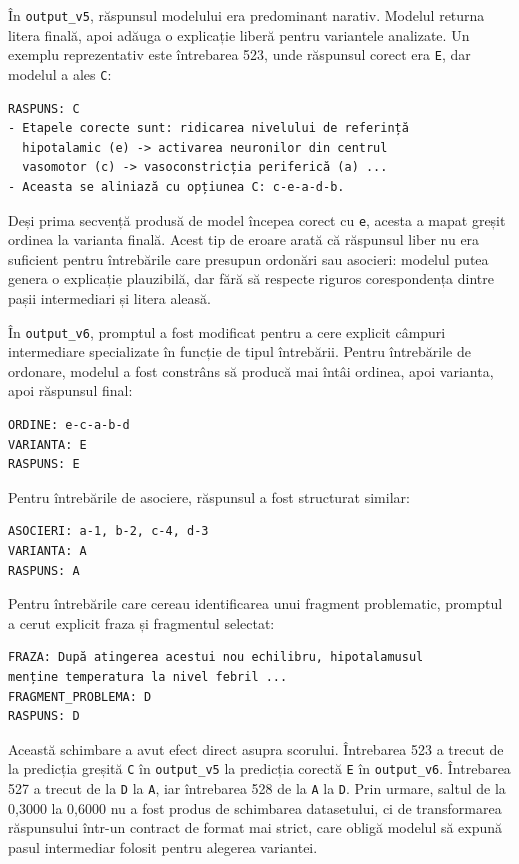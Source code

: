 \documentclass[12pt, a4paper, oneside, romanian]{teza-upb}
\begin{document}
În \texttt{output\_v5}, răspunsul modelului era predominant narativ. Modelul returna litera finală, apoi adăuga o explicație liberă pentru variantele analizate. Un exemplu reprezentativ este întrebarea 523, unde răspunsul corect era \texttt{E}, dar modelul a ales \texttt{C}:

\begin{lstlisting}[basicstyle=\ttfamily\footnotesize]
RASPUNS: C
- Etapele corecte sunt: ridicarea nivelului de referință
  hipotalamic (e) -> activarea neuronilor din centrul
  vasomotor (c) -> vasoconstricția periferică (a) ...
- Aceasta se aliniază cu opțiunea C: c-e-a-d-b.
\end{lstlisting}

Deși prima secvență produsă de model începea corect cu \texttt{e}, acesta a mapat greșit ordinea la varianta finală. Acest tip de eroare arată că răspunsul liber nu era suficient pentru întrebările care presupun ordonări sau asocieri: modelul putea genera o explicație plauzibilă, dar fără să respecte riguros corespondența dintre pașii intermediari și litera aleasă.

În \texttt{output\_v6}, promptul a fost modificat pentru a cere explicit câmpuri intermediare specializate în funcție de tipul întrebării. Pentru întrebările de ordonare, modelul a fost constrâns să producă mai întâi ordinea, apoi varianta, apoi răspunsul final:

\begin{lstlisting}[basicstyle=\ttfamily\footnotesize]
ORDINE: e-c-a-b-d
VARIANTA: E
RASPUNS: E
\end{lstlisting}

Pentru întrebările de asociere, răspunsul a fost structurat similar:

\begin{lstlisting}[basicstyle=\ttfamily\footnotesize]
ASOCIERI: a-1, b-2, c-4, d-3
VARIANTA: A
RASPUNS: A
\end{lstlisting}

Pentru întrebările care cereau identificarea unui fragment problematic, promptul a cerut explicit fraza și fragmentul selectat:

\begin{lstlisting}[basicstyle=\ttfamily\footnotesize]
FRAZA: După atingerea acestui nou echilibru, hipotalamusul
menține temperatura la nivel febril ...
FRAGMENT_PROBLEMA: D
RASPUNS: D
\end{lstlisting}

Această schimbare a avut efect direct asupra scorului. Întrebarea 523 a trecut de la predicția greșită \texttt{C} în \texttt{output\_v5} la predicția corectă \texttt{E} în \texttt{output\_v6}. Întrebarea 527 a trecut de la \texttt{D} la \texttt{A}, iar întrebarea 528 de la \texttt{A} la \texttt{D}. Prin urmare, saltul de la 0,3000 la 0,6000 nu a fost produs de schimbarea datasetului, ci de transformarea răspunsului într-un contract de format mai strict, care obligă modelul să expună pasul intermediar folosit pentru alegerea variantei.
\end{document}
